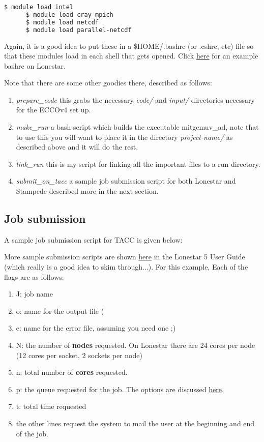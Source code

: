 \documentclass[a4paper,11pt]{article}
\begin{document}
	\begin{lstlisting}[language=bash]
	  $ module load intel
	  $ module load cray_mpich
	  $ module load netcdf
	  $ module load parallel-netcdf
	\end{lstlisting}

	Again, it is a good idea to put these in a \$HOME/.bashrc (or .cshrc, etc) file so that these modules load in each shell that gets opened. Click \href{http://users.ices.utexas.edu/~tsmith/bash-scripts/bashrc_tsmith_lonestar}{here} for an example bashrc on Lonestar.


	Note that there are some other goodies there, described as follows:
	\begin{enumerate}
	  \item \textit{prepare\_code} this grabs the necessary \textit{code/} and \textit{input/} directories necessary for the ECCOv4 set up. 
	  \item \textit{make\_run} a bash script which builds the executable mitgcmuv\_ad, note that to use this you will want to place it in the directory \textit{project-name/} as described above and it will do the rest. 
	  \item \textit{link\_run} this is my script for linking all the important files to a run directory.  
	  \item \textit{submit\_on\_tacc} a sample job submission script for both Lonestar and Stampede described more in the next section.
	\end{enumerate} 

	\subsection{Job submission} 

	A sample job submission script for TACC is given below: 
	
	

	More sample submission scripts are shown \href{https://portal.tacc.utexas.edu/user-guides/lonestar5#submit-a-batch-job-with-sbatch}{here} in the Lonestar 5 User Guide (which really is a good idea to skim through...). For this example, Each of the flags are as follows: 
	\begin{enumerate}
	  \item J: job name
	  \item o: name for the output file (%
	  \item e: name for the error file, assuming you need one ;) 
	  \item N: the number of \textbf{nodes} requested. On Lonestar there are 24 cores per node (12 cores per socket, 2 sockets per node) 
	  \item n: total number of \textbf{cores} requested.
	  \item p: the queue requested for the job. The options are discussed \href{https://portal.tacc.utexas.edu/user-guides/lonestar5#production-queues}{here}.
	  \item t: total time requested 
	  \item the other lines request the system to mail the user at the beginning and end of the job.
	\end{enumerate}
\end{document}
